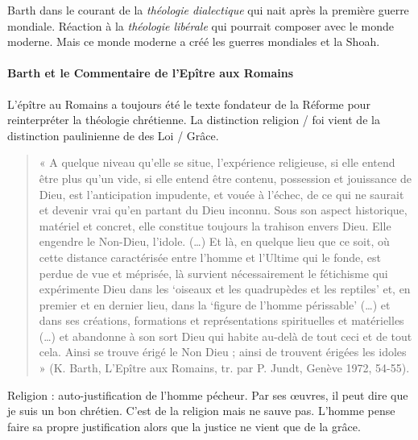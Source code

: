 Barth dans le courant de la \textit{théologie dialectique} qui nait après la première guerre mondiale. Réaction à la \textit{théologie libérale} qui pourrait composer avec le monde moderne. Mais ce monde moderne a créé les guerres mondiales et la Shoah.

\paragraph{Barth et le Commentaire de l’Epître aux Romains}

L'épître au Romains a toujours été le texte fondateur de la Réforme pour reinterpréter la théologie chrétienne. 
La distinction religion / foi vient de la distinction paulinienne de des Loi / Grâce.
\begin{quote}
    «  A  quelque  niveau  qu’elle  se  situe,  l’expérience  religieuse,  si  elle  entend  être  plus  qu’un  vide,  si  elle entend  être  contenu,  possession  et  jouissance  de  Dieu,  est  l’anticipation  impudente,  et  vouée  à  l’échec, de  ce  qui  ne  saurait  et  devenir  vrai  qu’en  partant  du  Dieu  inconnu.  Sous  son  aspect  historique,  matériel et  concret,  elle  constitue  toujours  la  trahison  envers  Dieu.  Elle  engendre  le  Non-Dieu,  l’idole.  (…)  Et là,  en  quelque  lieu  que  ce  soit,  où  cette  distance  caractérisée  entre  l’homme  et  l’Ultime  qui  le  fonde, est  perdue  de  vue  et  méprisée,  là  survient  nécessairement  le  fétichisme  qui  expérimente  Dieu  dans  les ‘oiseaux  et  les  quadrupèdes  et  les  reptiles’  et,  en  premier  et  en  dernier  lieu,  dans  la  ‘figure  de  l’homme périssable’  (…)  et  dans  ses  créations,  formations  et  représentations  spirituelles  et  matérielles  (…)  et abandonne  à  son  sort  Dieu  qui  habite  au-delà  de  tout  ceci  et  de  tout  cela.  Ainsi  se  trouve  érigé  le  Non Dieu  ;  ainsi  de  trouvent  érigées  les  idoles  »  (K.  Barth,  L’Epître  aux  Romains,  tr.  par  P.  Jundt,  Genève 1972,  54-55). 
\end{quote}

Religion : auto-justification de l’homme pécheur. Par ses œuvres, il peut dire que je suis un bon chrétien. C’est de la religion mais ne sauve pas. L’homme pense faire sa propre justification alors que la justice ne vient que de la grâce. 

